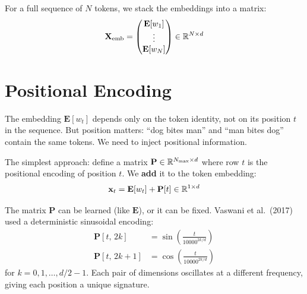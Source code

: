 \documentclass[main.tex]{subfiles}
\begin{document}
For a full sequence of $N$ tokens, we stack the embeddings into a matrix:
$$\mathbf{X}_{\text{emb}} = \begin{pmatrix} \mathbf{E}[w_1] \\ \vdots \\ \mathbf{E}[w_N] \end{pmatrix} \in \mathbb{R}^{N \times d}$$

\begin{center}
\end{center}

\needspace{0.33\textheight}
\section{Positional Encoding}

The embedding $\mathbf{E}[w_t]$ depends only on the token identity, not on its position $t$ in the sequence. But position matters: ``dog bites man'' and ``man bites dog'' contain the same tokens. We need to inject positional information.

The simplest approach: define a matrix $\mathbf{P} \in \mathbb{R}^{N_{\max} \times d}$ where row $t$ is the positional encoding of position $t$. We \textbf{add} it to the token embedding:
$$\mathbf{x}_t = \mathbf{E}[w_t] + \mathbf{P}[t] \in \mathbb{R}^{1 \times d}$$

The matrix $\mathbf{P}$ can be learned (like $\mathbf{E}$), or it can be fixed. Vaswani et al.\ (2017) used a deterministic sinusoidal encoding:
\begin{align}
\mathbf{P}[t,\, 2k] &= \sin\!\left(\frac{t}{10000^{2k/d}}\right) \\[6pt]
\mathbf{P}[t,\, 2k+1] &= \cos\!\left(\frac{t}{10000^{2k/d}}\right)
\end{align}
for $k = 0, 1, \ldots, d/2 - 1$. Each pair of dimensions oscillates at a different frequency, giving each position a unique signature.
\end{document}
